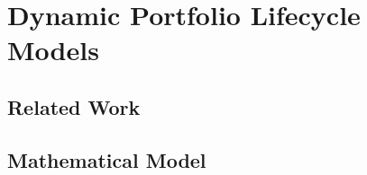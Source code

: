 \section{Dynamic Portfolio Lifecycle Models}

\blindtext{}



\subsection{Related Work}

\blindtext{}



\subsection{Mathematical Model}

\blindtext{}
